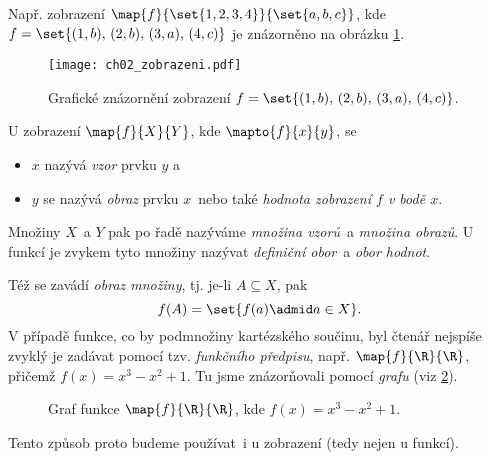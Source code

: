 Např. zobrazení $\map{f}{\set{1,2,3,4}}{\set{a,b,c}}$, kde $f=\set{(1,b),\,(2,b),\,(3,a),\,(4,c)}$ je znázorněno na obrázku \ref{fig:zobrazeni}.
\begin{figure}[H]
    \centering
    \texttt{[image: ch02\_zobrazeni.pdf]}
    \caption{Grafické znázornění zobrazení $f=\set{(1,b),\,(2,b),\,(3,a),\,(4,c)}$.}
    \label{fig:zobrazeni}
\end{figure}
U zobrazení $\map{f}{X}{Y}$, kde $\mapto{f}{x}{y}$, se
\begin{itemize}
    \item $x$ nazývá \emph{vzor} prvku $y$ a
    \item $y$ se nazývá \emph{obraz} prvku $x$~nebo také \emph{hodnota zobrazení $f$ v bodě $x$}.
\end{itemize}
Množiny $X$~a $Y$ pak po řadě nazýváme \emph{množina vzorů}~a \emph{množina obrazů}. U funkcí je zvykem tyto množiny nazývat \emph{definiční obor}~a \emph{obor hodnot}.\par
Též se zavádí \emph{obraz množiny}, tj. je-li $A\subseteq X$, pak
\begin{equation*}
    f(A)=\set{f(a) \admid a\in X}.
\end{equation*}
V případě funkce, co by podmnožiny kartézského součinu, byl čtenář nejspíše zvyklý je zadávat pomocí tzv. \emph{funkčního předpisu}, např. $\map{f}{\R}{\R}$, přičemž $f(x)=x^3-x^2+1$. Tu jsme znázorňovali pomocí \emph{grafu} (viz \ref{fig:funkce_graf}).
\begin{figure}[H]
    \centering
    
    \caption{Graf funkce $\map{f}{\R}{\R}$, kde $f(x)=x^3-x^2+1$.}
    \label{fig:funkce_graf}
\end{figure}
Tento způsob proto budeme používat~i u zobrazení (tedy nejen u funkcí).

